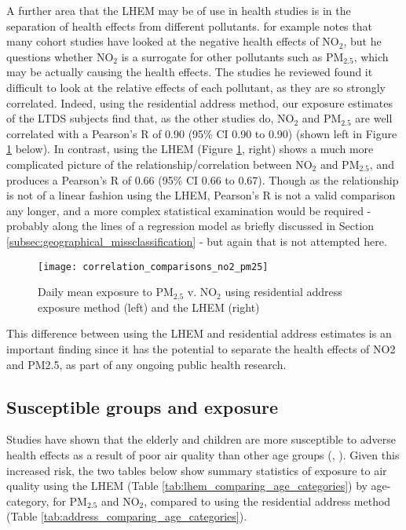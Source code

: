A further area that the LHEM may be of use in health studies is in the separation of health effects from different pollutants. \cite{Brunekreef2007} for example notes that many cohort studies have looked at the negative health effects of NO$_{2}$, but he questions whether NO$_{2}$ is a surrogate for other pollutants such as PM$_{2.5}$, which may be actually causing the health effects. The studies he reviewed found it difficult to look at the relative effects of each pollutant, as they are so strongly correlated. Indeed, using the residential address method, our exposure estimates of the LTDS subjects find that, as the other studies do, NO$_{2}$ and PM$_{2.5}$ are well correlated with a Pearson's R of 0.90 (95\% CI 0.90 to 0.90) (shown left in Figure \ref{fig:correlation_comparisons_no2_pm25} below). In contrast, using the LHEM (Figure \ref{fig:correlation_comparisons_no2_pm25}, right) shows a much more complicated picture of the relationship/correlation between NO$_{2}$ and PM$_{2.5}$, and produces a Pearson's R of 0.66 (95\% CI 0.66 to 0.67). Though as the relationship is not of a linear fashion using the LHEM, Pearson's R is not a valid comparison any longer, and a more complex statistical examination would be required - probably along the lines of a regression model as briefly discussed in Section \ref{subsec:geographical_missclassification} - but again that is not attempted here.

\begin{figure}[H]
\centering
\texttt{[image: correlation\_comparisons\_no2\_pm25]}
\caption{Daily mean exposure to PM$_{2.5}$ v. NO$_{2}$ using residential address exposure method (left) and the LHEM (right)}
\label{fig:correlation_comparisons_no2_pm25}
\end{figure}

This difference between using the LHEM and residential address estimates is an important finding since it has the potential to separate the health effects of NO2 and PM2.5, as part of any ongoing public health research.

\subsection{Susceptible groups and exposure}
\label{subsec:susceptible_groups}

Studies have shown that the elderly and children are more susceptible to adverse health effects as a result of poor air quality than other age groups (\cite{Wang2015}, \cite{WorldHealthOrganization2013a}). Given this increased risk, the two tables below show summary statistics of exposure to air quality using the LHEM (Table \ref{tab:lhem_comparing_age_categories}) by age-category, for PM$_{2.5}$ and NO$_{2}$, compared to using the residential address method (Table \ref{tab:address_comparing_age_categories}).

